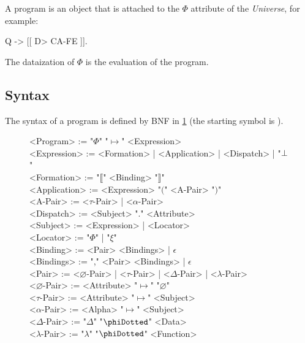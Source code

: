 A program is an object that is attached to the \(\Phi\) attribute
of the \emph{Universe}, for example:
\begin{phiquation*}
Q -> [[ D> CA-FE ]].
\end{phiquation*}
The dataization of \(\Phi\) is the evaluation of the program.

\subsection{Syntax}\label{sec:syntax}

The syntax of a program is defined by BNF in \cref{fig:ebnf} (the starting symbol is ).

\begin{figure*}
\begin{mdframed}
\raggedright
\begin{ebnf}[8em]
<Program> := "\(\Phi\)" "\(\mapsto\)" <Expression> \\
<Expression> := <Formation> | <Application> | <Dispatch> | "\(\bot\)" \\
<Formation> := "\(\llbracket\)" <Binding> "\(\rrbracket\)" \\
<Application> := <Expression> "\(\lparen\)" <A-Pair> "\(\rparen\)" \\
<A-Pair> := <\(\tau\)-Pair> | <\(\alpha\)-Pair> \\
<Dispatch> := <Subject> "." <Attribute> \\
<Subject> := <Expression> | <Locator> \\
<Locator> := "\(\Phi\)" | "\(\xi\)" \\
<Binding> := <Pair> <Bindings> | \(\epsilon\) \\
<Bindings> := "," <Pair> <Bindings> | \(\epsilon\) \\
<Pair> := <\(\varnothing\)-Pair> | <\(\tau\)-Pair> | <\(\Delta\)-Pair> | <\(\lambda\)-Pair> \\
<\(\varnothing\)-Pair> := <Attribute> "\(\mapsto\)" "\(\varnothing\)" \\
<\(\tau\)-Pair> := <Attribute> "\(\mapsto\)" <Subject> \\
<\(\alpha\)-Pair> := <Alpha> "\(\mapsto\)" <Subject> \\
<\(\Delta\)-Pair> := "\(\Delta\)" "\(\phiDotted\)" <Data> \\
<\(\lambda\)-Pair> := "\(\lambda\)" "\(\phiDotted\)" <Function> \\
\end{ebnf}
\end{mdframed}
\label{fig:ebnf}
\end{figure*}

